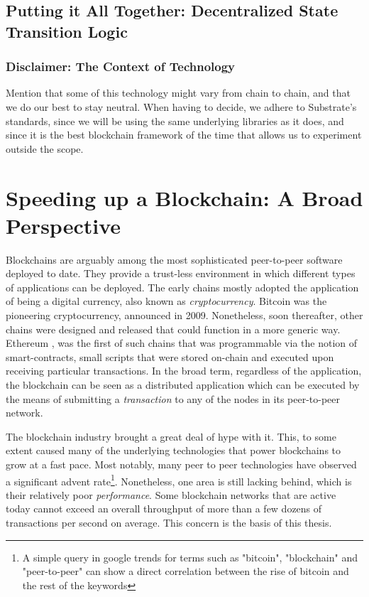 \subsection{Putting it All Together: Decentralized State Transition Logic}

\subsubsection{Disclaimer: The Context of Technology}

Mention that some of this technology might vary from chain to chain, and that we do our best to stay
neutral. When having to decide, we adhere to Substrate's standards, since we will be using the same
underlying libraries as it does, and since it is the best blockchain framework of the time that
allows us to experiment outside the scope.

\section{Speeding up a Blockchain: A Broad Perspective} \label{chap_bg:sec:ways_to_speedup}

Blockchains are arguably among the most sophisticated peer-to-peer software deployed to date. They
provide a trust-less environment in which different types of applications can be deployed. The early
chains mostly adopted the application of being a digital currency, also known as
\textit{cryptocurrency}. Bitcoin \cite{Nakamoto} was the pioneering cryptocurrency, announced in
2009. Nonetheless, soon thereafter, other chains were designed and released that could function in a
more generic way. Ethereum \cite{etherwhite}, was the first of such chains that was programmable via
the notion of smart-contracts, small scripts that were stored on-chain and executed upon receiving
particular transactions. In the broad term, regardless of the application, the blockchain can be
seen as a distributed application which can be executed by the means of submitting a
\textit{transaction} to any of the nodes in its peer-to-peer network.

The blockchain industry brought a great deal of hype with it. This, to some extent caused many of
the underlying technologies that power blockchains to grow at a fast pace. Most notably, many peer
to peer technologies have observed a significant advent rate\footnote{A simple query in google
trends for terms such as "bitcoin", "blockchain" and "peer-to-peer" can show a direct correlation
between the rise of bitcoin and the rest of the keywords}. Nonetheless, one area is still lacking
behind, which is their relatively poor \textit{performance}. Some blockchain networks that are
active today cannot exceed an overall throughput of more than a few dozens of transactions per
second on average. This concern is the basis of this thesis.

